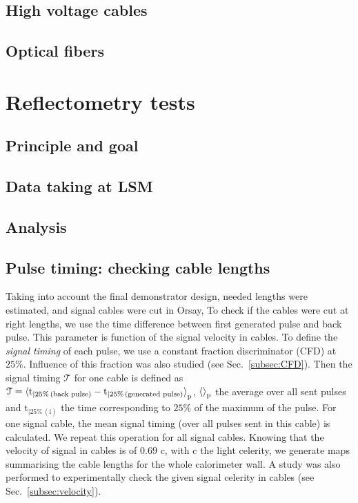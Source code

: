 \subsection{High voltage cables}
\subsection{Optical fibers}

\section{Reflectometry tests}
\label{sec:reflecto}
\subsection{Principle and goal}
\subsection{Data taking at LSM}
\subsection{Analysis}

\subsection*{Pulse timing: checking cable lengths}
\label{subsec:timing}

Taking into account the final demonstrator design, needed lengths were estimated, and signal cables were cut in Orsay,
To check if the cables were cut at right lengths, we use the time difference between first generated pulse and back pulse.
This parameter is function of the signal velocity in cables.
To define the \emph{signal timing} of each pulse, we use a constant fraction discriminator (CFD) at $25\%$. Influence of this fraction was also studied (see Sec.~\ref{subsec:CFD}).
Then the signal timing $\mathcal{T}$ for one cable is defined as $\mathcal{T}=\braket{\text{t}_{\vert 25\% \,(\text{back pulse})}-\text{t}_{\vert 25\% \,(\text{generated pulse})}}_{\text{p}}$, $\braket{}_{\text{p}}$ the average over all sent pulses and $\text{t}_{\vert 25\% \,(\text{i})}$ the time corresponding to $25 \%$ of the maximum of the pulse.
For one signal cable, the mean signal timing (over all pulses sent in this cable) is calculated.
We repeat this operation for all signal cables.
Knowing that the velocity of signal in cables is of $0.69$ c, with c the light celerity, we generate maps summarising the cable lengths for the whole calorimeter wall.
A study was also performed to experimentally check the given signal celerity in cables (see Sec.~\ref{subsec:velocity}).


